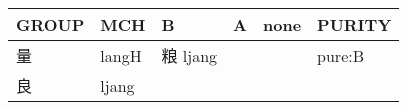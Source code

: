 \documentclass[14pt,a4paper]{scrartcl}
\begin{document}
\begin{longtable}[c]{@{}llllll@{}}
\toprule
\begin{minipage}[b]{0.14\columnwidth}\raggedright\strut
GROUP
\strut\end{minipage} &
\begin{minipage}[b]{0.14\columnwidth}\raggedright\strut
MCH
\strut\end{minipage} &
\begin{minipage}[b]{0.14\columnwidth}\raggedright\strut
B
\strut\end{minipage} &
\begin{minipage}[b]{0.14\columnwidth}\raggedright\strut
A
\strut\end{minipage} &
\begin{minipage}[b]{0.14\columnwidth}\raggedright\strut
none
\strut\end{minipage} &
\begin{minipage}[b]{0.14\columnwidth}\raggedright\strut
PURITY
\strut\end{minipage}\tabularnewline
\midrule
\endhead
\begin{minipage}[t]{0.14\columnwidth}\raggedright\strut
量
\strut\end{minipage} &
\begin{minipage}[t]{0.14\columnwidth}\raggedright\strut
langH
\strut\end{minipage} &
\begin{minipage}[t]{0.14\columnwidth}\raggedright\strut
粮 ljang
\strut\end{minipage} &
\begin{minipage}[t]{0.14\columnwidth}\raggedright\strut
\strut\end{minipage} &
\begin{minipage}[t]{0.14\columnwidth}\raggedright\strut
\strut\end{minipage} &
\begin{minipage}[t]{0.14\columnwidth}\raggedright\strut
pure:B
\strut\end{minipage}\tabularnewline
\begin{minipage}[t]{0.14\columnwidth}\raggedright\strut
良
\strut\end{minipage} &
\begin{minipage}[t]{0.14\columnwidth}\raggedright\strut
ljang
\strut\end{minipage} &
\begin{minipage}[t]{0.14\columnwidth}\raggedright\strut
\strut\end{minipage} &
\begin{minipage}[t]{0.14\columnwidth}\raggedright\strut

\end{minipage}
\end{longtable}
\end{document}
